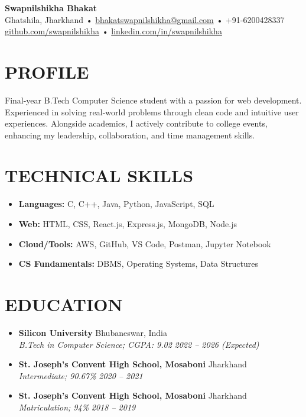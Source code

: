 \documentclass[a4paper,10pt]{article}
\newcommand{\resheading}[1]{\vspace{-5pt}\section*{\uppercase{#1}}\vspace{-6pt}}
\newcommand{\ressubheading}[4]{
  \textbf{#1} \hfill #2 \\
  \textit{#3} \hfill \textit{#4}
}
\begin{document}
\vspace{10pt} %
\begin{center}
    {\LARGE \textbf{Swapnilshikha Bhakat}} \\
    \vspace{1pt}
    Ghatshila, Jharkhand • \href{mailto:bhakatswapnilshikha@gmail.com}{bhakatswapnilshikha@gmail.com} • +91-6200428337 \\
    \href{https://github.com/swapnilshikha}{github.com/swapnilshikha} • \href{https://linkedin.com/in/swapnilshikha-bhakat-264221270}{linkedin.com/in/swapnilshikha}
\end{center}

\resheading{Profile}
\noindent
Final-year B.Tech Computer Science student with a passion for web development. Experienced in solving real-world problems through clean code and intuitive user experiences. Alongside academics, I actively contribute to college events, enhancing my leadership, collaboration, and time management skills.

\resheading{Technical Skills}
\begin{itemize}[leftmargin=0.2in, itemsep=2pt, topsep=1pt]
  \item \textbf{Languages:} C, C++, Java, Python, JavaScript, SQL
  \item \textbf{Web:} HTML, CSS, React.js, Express.js, MongoDB, Node.js
  \item \textbf{Cloud/Tools:} AWS, GitHub, VS Code, Postman, Jupyter Notebook
  \item \textbf{CS Fundamentals:} DBMS, Operating Systems, Data Structures
\end{itemize}

\resheading{Education}
\begin{itemize}[leftmargin=0.15in, itemsep=4pt, topsep=1pt]
  \item \ressubheading{Silicon University}{Bhubaneswar, India}{B.Tech in Computer Science; CGPA: 9.02}{2022 – 2026 (Expected)}
  \item \ressubheading{St. Joseph’s Convent High School, Mosaboni}{Jharkhand}{Intermediate; 90.67\%}{2020 – 2021}
  \item \ressubheading{St. Joseph’s Convent High School, Mosaboni}{Jharkhand}{Matriculation; 94\%}{2018 – 2019}
\end{itemize}
\end{document}
